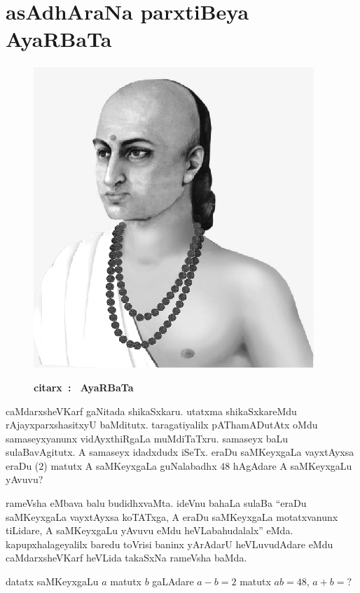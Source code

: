 \chapter{asAdhAraNa parxtiBeya AyaRBaTa}


\begin{figure}
  \centering\includegraphics[scale=0.8]{src/figures/aryabhata.eps}
  
  {\bf citarx~: ~AyaRBaTa}
    \end{figure}
    
caMdarxsheVKarf gaNitada shikaSxkaru. utatxma shikaSxkareMdu rAjayxparxshasitxyU baMditutx. taragatiyalilx pAThamADutAtx oMdu samaseyxyanunx vidAyxthiRgaLa muMdiTaTxru. samaseyx baLu sulaBavAgitutx. A samaseyx idadxdudx iSeTx. eraDu saMKeyxgaLa vayxtAyxsa eraDu ($2$) matutx A saMKeyxgaLa guNalabadhx $48$ hAgAdare A saMKeyxgaLu yAvuvu?

rameVsha eMbava balu budidhxvaMta. ideVnu bahaLa sulaBa ``eraDu saMKeyxgaLa vayxtAyxsa koTATxga, A eraDu saMKeyxgaLa motatxvanunx tiLidare, A saMKeyxgaLu yAvuvu eMdu heVLabahudalalx'' eMda. kapupxhalageyalilx baredu toVrisi baninx yArAdarU heVLuvudAdare eMdu caMdarxsheVKarf heVLida takaSxNa rameVsha baMda.

datatx saMKeyxgaLu $a$ matutx $b$ gaLAdare $a-b=2$ matutx $ab = 48$, $a+b=?$

